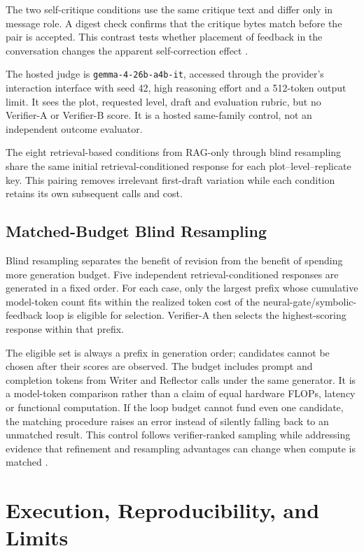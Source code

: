 The two self-critique conditions use the same critique text and differ only in message role. A digest check confirms that the critique bytes match before the pair is accepted. This contrast tests whether placement of feedback in the conversation changes the apparent self-correction effect \cite{b13,b14}.

The hosted judge is \texttt{gemma-4-26b-a4b-it}, accessed through the provider's interaction interface with seed 42, high reasoning effort and a 512-token output limit. It sees the plot, requested level, draft and evaluation rubric, but no Verifier-A or Verifier-B score. It is a hosted same-family control, not an independent outcome evaluator.

The eight retrieval-based conditions from RAG-only through blind resampling share the same initial retrieval-conditioned response for each plot--level--replicate key. This pairing removes irrelevant first-draft variation while each condition retains its own subsequent calls and cost.

\subsection{Matched-Budget Blind Resampling}

Blind resampling separates the benefit of revision from the benefit of spending more generation budget. Five independent retrieval-conditioned responses are generated in a fixed order. For each case, only the largest prefix whose cumulative model-token count fits within the realized token cost of the neural-gate/symbolic-feedback loop is eligible for selection. Verifier-A then selects the highest-scoring response within that prefix.

The eligible set is always a prefix in generation order; candidates cannot be chosen after their scores are observed. The budget includes prompt and completion tokens from Writer and Reflector calls under the same generator. It is a model-token comparison rather than a claim of equal hardware FLOPs, latency or functional computation. If the loop budget cannot fund even one candidate, the matching procedure raises an error instead of silently falling back to an unmatched result. This control follows verifier-ranked sampling \cite{b58} while addressing evidence that refinement and resampling advantages can change when compute is matched \cite{b16,b17}.

\section{Execution, Reproducibility, and Limits}

